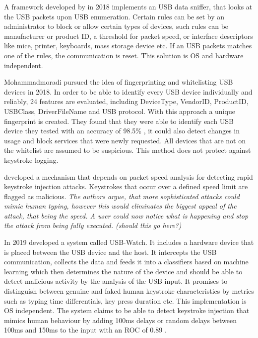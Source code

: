 A framework developed by \cite{erdinOSIndependentHardwareAssisted2018} in 2018 implements an USB data sniffer, that looks at the USB packets upon USB enumeration. Certain rules can be set by an administrator to block or allow certain types of devices, such rules can be manufacturer or product ID, a threshold for packet speed, or interface descriptors like mice, printer, keyboards, mass storage device etc. If an USB packets matches one of the rules, the communication is reset. This solution is OS and hardware independent. 

Mohammadmoradi \cite{mohammadmoradiMakingWhitelistingBasedDefense2018} pursued the idea of fingerprinting and whitelisting USB devices in 2018. In order to be able to identify every USB device individually and reliably, 24 features are evaluated, including DeviceType, VendorID, ProductID, USBClass, DriverFileName and USB protocol. With this approach a unique fingerprint is created. They found that they were able to identify each USB device they tested with an accuracy of 98.5\% , it could also detect changes in usage and block services that were newly requested. All devices that are not on the whitelist are assumed to be suspicious. This method does not protect against keystroke logging. 

\cite{neunerUSBlockBlockingUSBBased2018} developed a mechanism that depends on packet speed analysis for detecting rapid keystroke injection attacks. Keystrokes that occur over a defined speed limit are flagged as malicious.\textit{ The authors argue, that more sophisticated attacks could mimic human typing, however this would eliminates the biggest appeal of the attack, that being the speed. A user could now notice what is happening and stop the attack from being fully executed. (should this go here?) }

In 2019 \cite{denneyUSBWatchDynamicHardwareAssisted2019} developed a system called USB-Watch. It includes a hardware device that is placed between the USB device and the host. It intercepts the USB communication, collects the data and feeds it into a classifiers based on machine learning which then determines the nature of the device and should be able to detect malicious activity by the analysis of the USB input. It promises to distinguish between genuine and faked human keystroke characteristics by metrics such as typing time differentials, key press duration etc. This implementation is OS independent. The system claims to be able to detect keystroke injection that mimics human behaviour by adding 100ms delays or random delays between 100ms and 150ms to the input with an ROC of 0.89 . 

